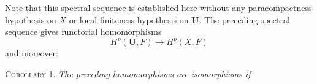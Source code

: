 Note that this spectral sequence is established here without any paracompactness
hypothesis on $X$ or local-finiteness hypothesis on $\mathbf U$. The
preceding spectral sequence gives functorial homomorphisms
\[
H^p(\mathbf U,F)\to H^p(X,F)
\]
and moreover:

\textsc{Corollary 1.} \textit{The preceding homomorphisms are
isomorphisms if}


